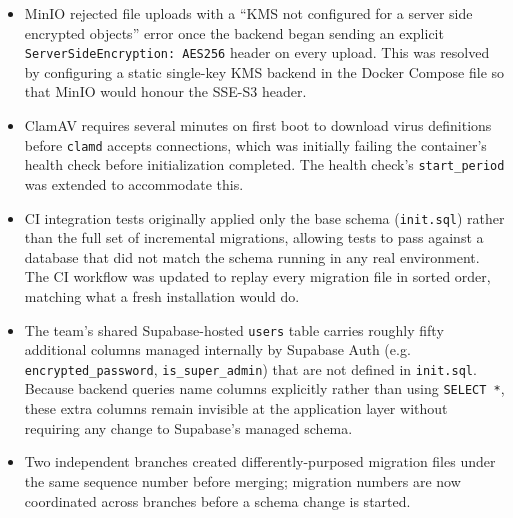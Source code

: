 \documentclass[12pt]{article}
\begin{document}
\begin{itemize}[leftmargin=1.4em]
\item MinIO rejected file uploads with a ``KMS not configured for a server side encrypted objects'' error once the backend began sending an explicit \texttt{ServerSideEncryption: AES256} header on every upload. This was resolved by configuring a static single-key KMS backend in the Docker Compose file so that MinIO would honour the SSE-S3 header.
\item ClamAV requires several minutes on first boot to download virus definitions before \texttt{clamd} accepts connections, which was initially failing the container's health check before initialization completed. The health check's \texttt{start\_period} was extended to accommodate this.
\item CI integration tests originally applied only the base schema (\texttt{init.sql}) rather than the full set of incremental migrations, allowing tests to pass against a database that did not match the schema running in any real environment. The CI workflow was updated to replay every migration file in sorted order, matching what a fresh installation would do.
\item The team's shared Supabase-hosted \texttt{users} table carries roughly fifty additional columns managed internally by Supabase Auth (e.g. \texttt{encrypted\_password}, \texttt{is\_super\_admin}) that are not defined in \texttt{init.sql}. Because backend queries name columns explicitly rather than using \texttt{SELECT *}, these extra columns remain invisible at the application layer without requiring any change to Supabase's managed schema.
\item Two independent branches created differently-purposed migration files under the same sequence number before merging; migration numbers are now coordinated across branches before a schema change is started.

\end{itemize}
\end{document}

